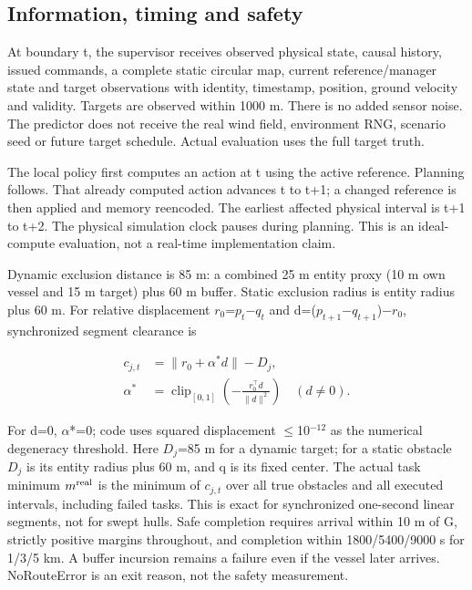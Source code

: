 \documentclass[conference]{IEEEtran}
\begin{document}
\subsection{Information, timing and safety}

At boundary t, the supervisor receives observed physical state, causal history, issued commands, a complete static circular map, current reference/manager state and target observations with identity, timestamp, position, ground velocity and validity. Targets are observed within 1000 m. There is no added sensor noise. The predictor does not receive the real wind field, environment RNG, scenario seed or future target schedule. Actual evaluation uses the full target truth.

The local policy first computes an action at t using the active reference. Planning follows. That already computed action advances t to t+1; a changed reference is then applied and memory reencoded. The earliest affected physical interval is t+1 to t+2. The physical simulation clock pauses during planning. This is an ideal-compute evaluation, not a real-time implementation claim.

Dynamic exclusion distance is 85 m: a combined 25 m entity proxy (10 m own vessel and 15 m target) plus 60 m buffer. Static exclusion radius is entity radius plus 60 m. For relative displacement $r_0$=$p_t$\ensuremath{-}$q_t$ and d=($p_{t+1}$\ensuremath{-}$q_{t+1}$)\ensuremath{-}$r_0$, synchronized segment clearance is

\begin{equation}\label{eq:1}
\begin{aligned}c_{j,t}&=\|r_0+\alpha^*d\|-D_j,\\\alpha^*&=\operatorname{clip}_{[0,1]}\!\left(-\frac{r_0^\top d}{\|d\|^2}\right)\quad(d\ne0).\end{aligned}
\end{equation}

For d=0, \ensuremath{\alpha}*=0; code uses squared displacement \ensuremath{\le}10$^{-12}$ as the numerical degeneracy threshold. Here $D_j$=85 m for a dynamic target; for a static obstacle $D_j$ is its entity radius plus 60 m, and q is its fixed center. The actual task minimum $m^{\rm real}$ is the minimum of $c_{j,t}$ over all true obstacles and all executed intervals, including failed tasks. This is exact for synchronized one-second linear segments, not for swept hulls. Safe completion requires arrival within 10 m of G, strictly positive margins throughout, and completion within 1800/5400/9000 s for 1/3/5 km. A buffer incursion remains a failure even if the vessel later arrives. NoRouteError is an exit reason, not the safety measurement.
\end{document}
